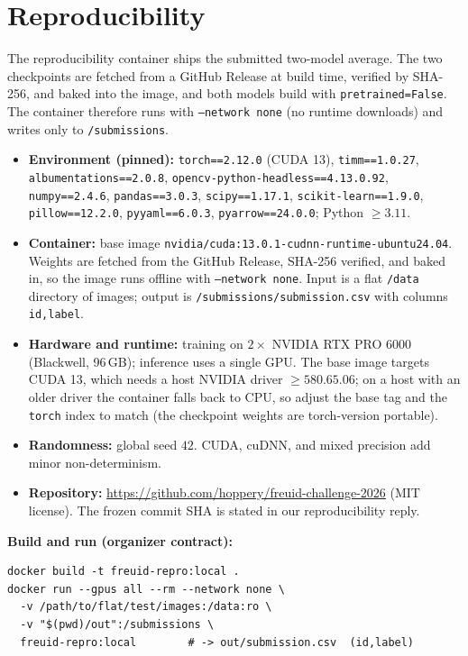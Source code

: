 \documentclass[11pt,a4paper]{article}
\begin{document}
\section{Reproducibility}
\label{sec:repro}
The reproducibility container ships the submitted two-model average. The two checkpoints are fetched from a
GitHub Release at build time, verified by SHA-256, and baked into the image, and both models build with
\texttt{pretrained=False}. The container therefore runs with \texttt{--network none} (no runtime downloads)
and writes only to \texttt{/submissions}.
\begin{itemize}[leftmargin=1.2em,itemsep=1pt,topsep=2pt]
  \item \textbf{Environment (pinned):} \texttt{torch==2.12.0} (CUDA 13), \texttt{timm==1.0.27},
        \texttt{albumentations==2.0.8}, \texttt{opencv-python-headless==4.13.0.92}, \texttt{numpy==2.4.6},
        \texttt{pandas==3.0.3}, \texttt{scipy==1.17.1}, \texttt{scikit-learn==1.9.0},
        \texttt{pillow==12.2.0}, \texttt{pyyaml==6.0.3}, \texttt{pyarrow==24.0.0}; Python $\geq 3.11$.
  \item \textbf{Container:} base image \texttt{nvidia/cuda:13.0.1-cudnn-runtime-ubuntu24.04}. Weights are
        fetched from the GitHub Release, SHA-256 verified, and baked in, so the image runs offline with
        \texttt{--network none}. Input is a flat \texttt{/data} directory of images; output is
        \texttt{/submissions/submission.csv} with columns \texttt{id,label}.
  \item \textbf{Hardware and runtime:} training on $2\times$ NVIDIA RTX PRO 6000 (Blackwell, 96\,GB);
        inference uses a single GPU. The base image targets CUDA 13, which needs a host NVIDIA driver
        $\geq 580.65.06$; on a host with an older driver the container falls back to CPU, so adjust the base
        tag and the \texttt{torch} index to match (the checkpoint weights are torch-version portable).
  \item \textbf{Randomness:} global seed $42$. CUDA, cuDNN, and mixed precision add minor non-determinism.
  \item \textbf{Repository:} \url{https://github.com/hoppery/freuid-challenge-2026} (MIT license). The frozen
        commit SHA is stated in our reproducibility reply.
\end{itemize}

\noindent\textbf{Build and run (organizer contract):}
{\footnotesize
\begin{verbatim}
docker build -t freuid-repro:local .
docker run --gpus all --rm --network none \
  -v /path/to/flat/test/images:/data:ro \
  -v "$(pwd)/out":/submissions \
  freuid-repro:local        # -> out/submission.csv  (id,label)
\end{verbatim}}
\end{document}
